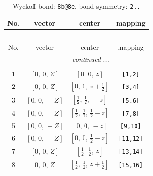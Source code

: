 \documentclass[fleqn,8pt]{jsarticle}
\begin{document}
\begin{longtable}{cccc}
\caption{Wyckoff bond: {\tt 8b@8e}, bond symmetry: {\tt 2..}}
 \\
 \hline \hline
No. & vector & center & mapping \\ \hline \endfirsthead

\multicolumn{3}{l}{\tablename\ \thetable{}} \\
 \hline \hline
No. & vector & center & mapping \\ \hline \endhead

 \hline \hline
\multicolumn{3}{r}{\footnotesize\it continued ...} \\ \endfoot

 \hline \hline
\multicolumn{3}{r}{} \\ \endlastfoot

1 & $\left[ 0,\, 0,\, Z \right]$ & $\left[ 0,\, 0,\, z \right]$ & {\tt [1,2]} \\ \hline
2 & $\left[ 0,\, 0,\, Z \right]$ & $\left[ 0,\, 0,\, z + \frac{1}{2} \right]$ & {\tt [3,4]} \\ \hline
3 & $\left[ 0,\, 0,\, - Z \right]$ & $\left[ \frac{1}{2},\, \frac{1}{2},\, - z \right]$ & {\tt [5,6]} \\ \hline
4 & $\left[ 0,\, 0,\, - Z \right]$ & $\left[ \frac{1}{2},\, \frac{1}{2},\, \frac{1}{2} - z \right]$ & {\tt [7,8]} \\ \hline
5 & $\left[ 0,\, 0,\, - Z \right]$ & $\left[ 0,\, 0,\, - z \right]$ & {\tt [9,10]} \\ \hline
6 & $\left[ 0,\, 0,\, - Z \right]$ & $\left[ 0,\, 0,\, \frac{1}{2} - z \right]$ & {\tt [11,12]} \\ \hline
7 & $\left[ 0,\, 0,\, Z \right]$ & $\left[ \frac{1}{2},\, \frac{1}{2},\, z \right]$ & {\tt [13,14]} \\ \hline
8 & $\left[ 0,\, 0,\, Z \right]$ & $\left[ \frac{1}{2},\, \frac{1}{2},\, z + \frac{1}{2} \right]$ & {\tt [15,16]} \\
\end{longtable}
\renewcommand{\arraystretch}{1.2}
\end{document}
